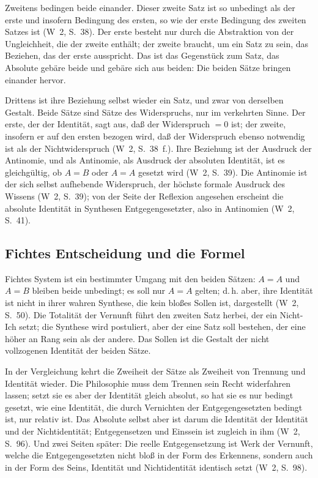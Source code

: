 \documentclass[11pt,a4paper]{article}
\newcommand{\Werke}[1]{(W~2, S.~#1)}
\begin{document}
Zweitens bedingen beide einander. \glqq Dieser zweite Satz ist so unbedingt als der erste und insofern Bedingung des ersten, so wie der erste Bedingung des zweiten Satzes ist\grqq{} \Werke{38}. Der erste besteht nur durch die Abstraktion von der Ungleichheit, die der zweite enthält; der zweite braucht, um ein Satz zu sein, das Beziehen, das der erste ausspricht. Das ist das Gegenstück zum Satz, das Absolute gebäre beide und gebäre sich aus beiden: Die beiden Sätze bringen einander hervor.

Drittens ist ihre Beziehung selbst wieder ein Satz, und zwar von derselben Gestalt. \glqq Beide Sätze sind Sätze des Widerspruchs, nur im verkehrten Sinne. Der erste, der der Identität, sagt aus, daß der Widerspruch $= 0$ ist; der zweite, insofern er auf den ersten bezogen wird, daß der Widerspruch ebenso notwendig ist als der Nichtwiderspruch\grqq{} \Werke{38~f.}. Ihre Beziehung ist \glqq der Ausdruck der Antinomie\grqq{}, und als Antinomie, \glqq als Ausdruck der absoluten Identität\grqq{}, ist es gleichgültig, ob $A = B$ oder $A = A$ gesetzt wird \Werke{39}. Die Antinomie ist der \glqq sich selbst aufhebende Widerspruch\grqq{}, der höchste formale Ausdruck des Wissens \Werke{39}; von der Seite der Reflexion angesehen \glqq erscheint die absolute Identität in Synthesen Entgegengesetzter, also in Antinomien\grqq{} \Werke{41}.

\subsection{Fichtes Entscheidung und die Formel}

Fichtes System ist ein bestimmter Umgang mit den beiden Sätzen: \glqq $A = A$ und $A = B$ bleiben beide unbedingt; es soll nur $A = A$ gelten; d.\,h. aber, ihre Identität ist nicht in ihrer wahren Synthese, die kein bloßes Sollen ist, dargestellt\grqq{} \Werke{50}. Die Totalität der Vernunft führt den zweiten Satz herbei, der ein Nicht-Ich setzt; die Synthese wird postuliert, aber \glqq der eine Satz soll bestehen, der eine höher an Rang sein als der andere\grqq{}. Das Sollen ist die Gestalt der nicht vollzogenen Identität der beiden Sätze.

In der Vergleichung kehrt die Zweiheit der Sätze als Zweiheit von Trennung und Identität wieder. Die Philosophie muss dem Trennen sein Recht widerfahren lassen; setzt sie es aber der Identität gleich absolut, so hat sie es nur bedingt gesetzt, wie eine Identität, die durch Vernichten der Entgegengesetzten bedingt ist, nur relativ ist. \glqq Das Absolute selbst aber ist darum die Identität der Identität und der Nichtidentität; Entgegensetzen und Einssein ist zugleich in ihm\grqq{} \Werke{96}. Und zwei Seiten später: Die reelle Entgegensetzung ist Werk der Vernunft, \glqq welche die Entgegengesetzten nicht bloß in der Form des Erkennens, sondern auch in der Form des Seins, Identität und Nichtidentität identisch setzt\grqq{} \Werke{98}.
\end{document}
